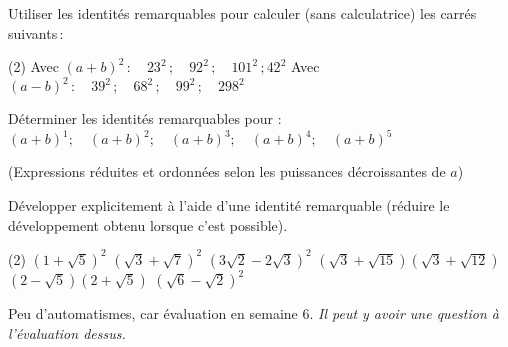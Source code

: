 \documentclass[a4paper,12pt]{report}
\begin{document}
\begin{exo}
	Utiliser les identités remarquables pour calculer (sans calculatrice) les carrés suivants\,:
	\begin{tasks}(2)
\task Avec $(a+b)^2\,: \quad  23^2\,;\quad  92^2\,;\quad 101^2\,; 42^2$
\task Avec $(a-b)^2\,:\quad 39^2\,;\quad 68^2\,;\quad 99^2\,;\quad 298^2$
	\end{tasks}
\end{exo}
\begin{exo}
Déterminer les identités remarquables pour : $(a+b)^1 ; \quad(a+b)^2 ; \quad(a+b)^3 ; \quad(a+b)^4 ; \quad(a+b)^5$ 

(Expressions réduites et ordonnées selon les puissances décroissantes de $a$)
\end{exo}
\begin{exo}
Développer explicitement à l'aide d'une identité remarquable
(réduire le développement obtenu lorsque c'est possible).
	\begin{tasks}(2)
\task $(1+\sqrt{5})^2$
\task $(\sqrt{3}+\sqrt{7})^2$
\task $(3 \sqrt{2}-2 \sqrt{3})^2$
\task $(\sqrt{3}+\sqrt{15})(\sqrt{3}+\sqrt{12})$
\task $(2-\sqrt{5})(2+\sqrt{5})$
\task $(\sqrt{6}-\sqrt{2})^2$
	\end{tasks}
\end{exo}


Peu d'automatismes, car évaluation en semaine 6. \emph{Il peut y avoir une question à l'évaluation dessus.}
\end{document}
